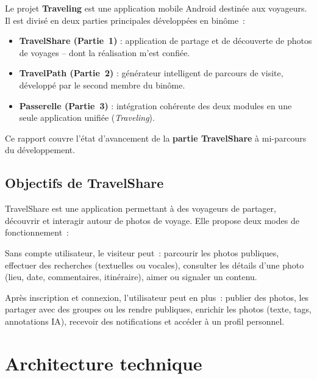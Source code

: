 \documentclass[12pt, a4paper]{report}
\begin{document}
Le projet \textbf{Traveling} est une application mobile Android destinée aux voyageurs. Il est
divisé en deux parties principales développées en binôme~:

\begin{itemize}
  \item \textbf{TravelShare (Partie~1)} : application de partage et de découverte de photos
        de voyages -- dont la réalisation m'est confiée.
  \item \textbf{TravelPath (Partie~2)} : générateur intelligent de parcours de visite,
        développé par le second membre du binôme.
  \item \textbf{Passerelle (Partie~3)} : intégration cohérente des deux modules en une
        seule application unifiée (\textit{Traveling}).
\end{itemize}

Ce rapport couvre l'état d'avancement de la \textbf{partie TravelShare} à mi-parcours du
développement.

\section{Objectifs de TravelShare}

TravelShare est une application permettant à des voyageurs de partager, découvrir et interagir
autour de photos de voyage. Elle propose deux modes de fonctionnement~:

\begin{infobox}
Sans compte utilisateur, le visiteur peut~: parcourir les photos publiques, effectuer des
recherches (textuelles ou vocales), consulter les détails d'une photo (lieu, date,
commentaires, itinéraire), aimer ou signaler un contenu.
\end{infobox}

\begin{infobox}
Après inscription et connexion, l'utilisateur peut en plus~: publier des photos, les partager
avec des groupes ou les rendre publiques, enrichir les photos (texte, tags, annotations IA),
recevoir des notifications et accéder à un profil personnel.
\end{infobox}

\chapter{Architecture technique}
\end{document}
